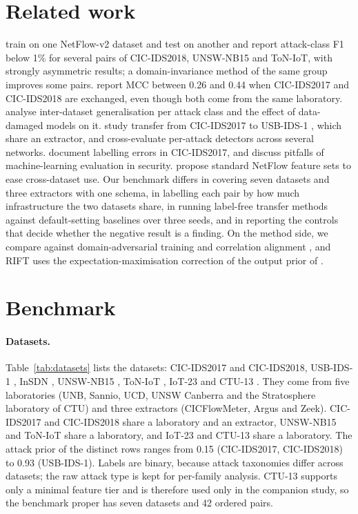 \documentclass[11pt]{article}
\begin{document}
\section{Related work}
\citet{layeghy2023explainable} train on one NetFlow-v2 dataset and test on another and report attack-class F1 below 1\% for several pairs of CIC-IDS2018, UNSW-NB15 and ToN-IoT, with strongly asymmetric results; a domain-invariance method of the same group \citep{layeghy2023dinids} improves some pairs.
\citet{cantone2024crossdataset} report MCC between 0.26 and 0.44 when CIC-IDS2017 and CIC-IDS2018 are exchanged, even though both come from the same laboratory.
\citet{dhooge2020inter,dhooge2023damaged} analyse inter-dataset generalisation per attack class and the effect of data-damaged models on it.
\citet{catillo2022transferability} study transfer from CIC-IDS2017 to USB-IDS-1 \citep{catillo2021usbids1}, which share an extractor, and \citet{apruzzese2022cross} cross-evaluate per-attack detectors across several networks.
\citet{engelen2021troubleshooting} document labelling errors in CIC-IDS2017, and \citet{arp2022dos,apruzzese2023sok} discuss pitfalls of machine-learning evaluation in security.
\citet{sarhan2022standard} propose standard NetFlow feature sets to ease cross-dataset use.
Our benchmark differs in covering seven datasets and three extractors with one schema, in labelling each pair by how much infrastructure the two datasets share, in running label-free transfer methods against default-setting baselines over three seeds, and in reporting the controls that decide whether the negative result is a finding.
On the method side, we compare against domain-adversarial training \citep{ganin2016dann} and correlation alignment \citep{sun2016coral}, and RIFT uses the expectation-maximisation correction of the output prior of \citet{saerens2002adjusting}.

\section{Benchmark}
\paragraph{Datasets.}
Table~\ref{tab:datasets} lists the datasets: CIC-IDS2017 \citep{sharafaldin2018cicids} and CIC-IDS2018, USB-IDS-1 \citep{catillo2021usbids1}, InSDN \citep{elsayed2020insdn}, UNSW-NB15 \citep{moustafa2015unsw}, ToN-IoT \citep{alsaedi2020toniot}, IoT-23 \citep{garcia2020iot23} and CTU-13 \citep{garcia2014ctu13}.
They come from five laboratories (UNB, Sannio, UCD, UNSW Canberra and the Stratosphere laboratory of CTU) and three extractors (CICFlowMeter, Argus and Zeek).
CIC-IDS2017 and CIC-IDS2018 share a laboratory and an extractor, UNSW-NB15 and ToN-IoT share a laboratory, and IoT-23 and CTU-13 share a laboratory.
The attack prior of the distinct rows ranges from 0.15 (CIC-IDS2017, CIC-IDS2018) to 0.93 (USB-IDS-1).
Labels are binary, because attack taxonomies differ across datasets; the raw attack type is kept for per-family analysis.
CTU-13 supports only a minimal feature tier and is therefore used only in the companion study, so the benchmark proper has seven datasets and 42 ordered pairs.
\end{document}
